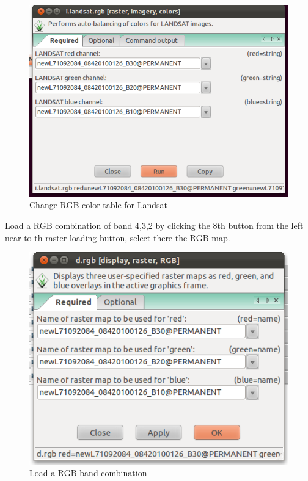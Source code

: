 \begin{figure}[htbp]
   \centering
   \includegraphics[scale=0.35]{grass_rs003.png}
   \caption{Change RGB color table for Landsat}
   \label{fig:grass_rs003}
\end{figure}

Load a RGB combination of band 4,3,2 by clicking the 8th button from the left near to th raster loading button, select there the RGB map.

\begin{figure}[htbp]
   \centering
   \includegraphics[scale=0.45]{grass_rs004.png}
   \caption{Load a RGB band combination}
   \label{fig:grass_rs004}
\end{figure}

